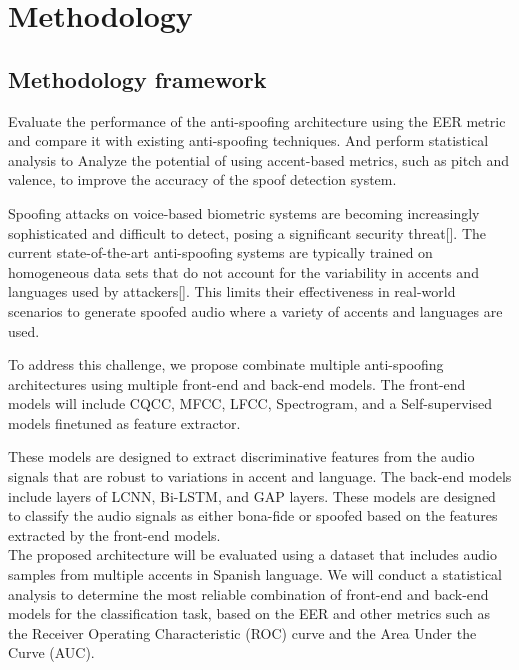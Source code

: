 
\chapter{Methodology}

\section{Methodology framework}

Evaluate the performance of the anti-spoofing architecture using the \ac{EER} metric and compare it with existing anti-spoofing techniques. And perform statistical analysis to Analyze the potential of using accent-based metrics, such as pitch and valence, to improve the accuracy of the spoof detection system.

Spoofing attacks on voice-based biometric systems are becoming increasingly sophisticated and difficult to detect, posing a significant security threat[]. The current state-of-the-art anti-spoofing systems are typically trained on homogeneous data sets that do not account for the variability in accents and languages used by attackers[]. This limits their effectiveness in real-world scenarios to generate spoofed audio where a variety of accents and languages are used.

To address this challenge, we propose combinate multiple anti-spoofing architectures using multiple front-end and back-end models. The front-end models will include \acs{CQCC}, \acs{MFCC}, \acs{LFCC}, Spectrogram, and a Self-supervised models finetuned as feature extractor.

These models are designed to extract discriminative features from the audio signals that are robust to variations in accent and language. The back-end models include layers of \acs{LCNN}, \acs{Bi-LSTM}, and \acs{GAP} layers. These models are designed to classify the audio signals as either bona-fide or spoofed based on the features extracted by the front-end models.\\

The proposed architecture will be evaluated using a dataset that includes audio samples from multiple accents in Spanish language. We will conduct a statistical analysis to determine the most reliable combination of front-end and back-end models for the classification task, based on the \acs{EER} and other metrics such as the Receiver Operating Characteristic (ROC) curve and the Area Under the Curve (AUC).\\

